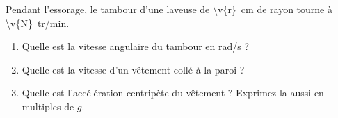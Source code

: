 Pendant l'essorage, le tambour d'une laveuse de \qty{\v{r}}{cm} de rayon tourne à \qty{\v{N}}{tr/min}.

\begin{enumerate}[label=\alph*)]
    \item Quelle est la vitesse angulaire du tambour en rad/s ?
    \item Quelle est la vitesse d'un vêtement collé à la paroi ?
    \item Quelle est l'accélération centripète du vêtement ? Exprimez-la aussi en multiples de $g$.
\end{enumerate}
